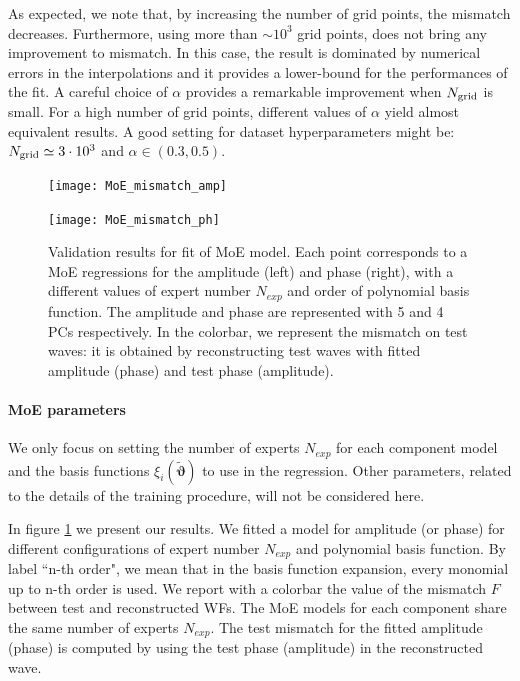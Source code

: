 As expected, we note that, by increasing the number of grid points, the mismatch decreases. Furthermore, using more than $\sim 10^3$ grid points, does not bring any improvement to mismatch. In this case, the result is dominated by numerical errors in the interpolations and it provides a lower-bound for the performances of the fit.
A careful choice of $\alpha$ provides a remarkable improvement when $N_{\rm grid}$ is small. For a high number of grid points, different values of $\alpha$ yield almost equivalent results.
A good setting for dataset hyperparameters might be: $N_{\rm grid} \simeq 3 \cdot 10^{3}$ and $\alpha \in (0.3,0.5)$.
\begin{figure}[!t]
	\centering
    \begin{minipage}{.5\linewidth}
        \centering
        \texttt{[image: MoE\_mismatch\_amp]}
    \end{minipage}\hfill
    \begin{minipage}{.5\linewidth}
        \centering
        \texttt{[image: MoE\_mismatch\_ph]}
    \end{minipage}
	\caption{Validation results for fit of MoE model. Each point corresponds to a MoE regressions for the amplitude (left) and phase (right), with a different values of expert number $N_{exp}$ and order of polynomial basis function.
The amplitude and phase are represented with 5 and 4 PCs respectively.
In the colorbar, we represent the mismatch on test waves: it is obtained by reconstructing test waves with fitted amplitude (phase) and test phase (amplitude).
}
	\label{fig:MoE_test}
\end{figure}


\paragraph{MoE parameters}
We only focus on setting the number of experts $N_{exp}$ for each component model and the basis functions $\xi_i(\boldsymbol{\tilde{\vartheta}})$ to use in the regression. Other parameters, related to the details of the training procedure, will not be considered here.

In figure \ref{fig:MoE_test} we present our results.
We fitted a model for amplitude (or phase) for different configurations of expert number $N_{exp}$ and polynomial basis function.
By label ``n-th order", we mean that in the basis function expansion, every monomial up to n-th order is used.
We report with a colorbar the value of the mismatch $F$ between test and reconstructed WFs. The MoE models for each component share the same number of experts $N_{exp}$.
The test mismatch for the fitted amplitude (phase) is computed by using the test phase (amplitude) in the reconstructed wave.

